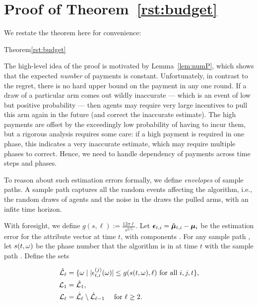 \section{Proof of Theorem~\ref{rst:budget}}
\label{sec:payment-proof}

We restate the theorem here for convenience:

\begin{rtheorem}{Theorem}{\ref{rst:budget}}
\end{rtheorem}

The high-level idea of the proof is motivated by Lemma~\ref{lem:numP},
which shows that the expected \emph{number} of payments is constant.
Unfortunately, in contrast to the regret, there is no hard upper bound
on the payment in any one round.
If a draw of a particular arm comes out wildly inaccurate --- which is
an event of low but positive probability ---
then agents may require very large incentives to pull this arm again
in the future (and correct the inaccurate estimate).
The high payments are offset by the exceedingly low probability of
having to incur them, but a rigorous analysis requires some care:
if a high payment is required in one phase, this indicates a very
inaccurate estimate, which may require multiple phases to correct.
Hence, we need to handle dependency of payments across time steps and
phases.

To reason about such estimation errors formally, we define
\emph{envelopes} of sample paths.
A sample path \SP captures all the random events affecting the
algorithm, i.e., the random draws  of agents and the
noise \NoiseV[t] in the draws the pulled arms,
with an infite  time horizon.

With foresight, we define $g(s, \ell) := \frac{12 \sigma \ell}{s^{2/5}}$.
Let $\bm{\epsilon}_{t,i} = \bm{\hat{\mu}}_{t,i} - \bm{\mu}_{i}$ be the estimation
error for the attribute vector  at time $t$,
with components .
For any sample path \SP, let $s (t,\omega)$ be the phase number that the
algorithm is in at time $t$ with the sample path \SP.
Define the sets

\begin{align*}
\hat{\mathcal{L}}_\ell
  & = \{ \omega \mid |\epsilon_{t,i}^{(j)}(\omega)| \leq g(s(t,\omega),\ell)
    \mbox{ for all } i,j,t \},\\
{\mathcal L}_{1} & = \hat{\mathcal{L}}_1,\\ 
{\mathcal L}_{\ell} & = \hat{\mathcal{L}}_{\ell} \setminus \hat{\mathcal{L}}_{\ell-1}
  \quad \mbox{ for } \ell \geq 2.
\end{align*}

